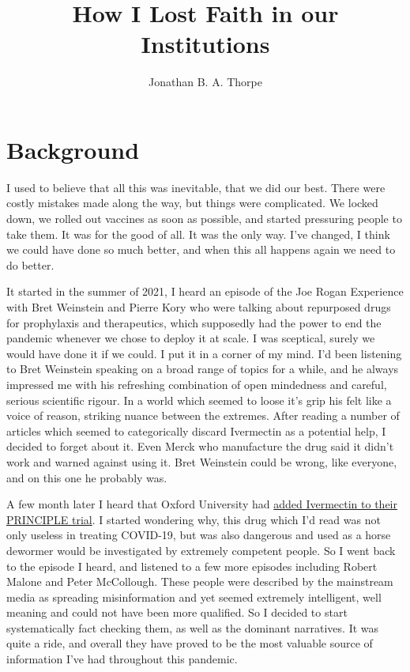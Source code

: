 \documentclass[11pt,a4paper]{article}
\title{How I Lost Faith in our Institutions}
\author{Jonathan B. A. Thorpe}
\begin{document}

\maketitle

\section*{Background}

I used to believe that all this was inevitable, that we did our best. There were costly mistakes made along the way, but things were complicated. We locked down, we rolled out vaccines as soon as possible, and started pressuring people to take them. It was for the good of all. It was the only way. I’ve changed, I think we could have done so much better, and when this all happens again we need to do better. 

It started in the summer of 2021, I heard an episode of the Joe Rogan Experience with Bret Weinstein and Pierre Kory who were talking about repurposed drugs for prophylaxis and therapeutics, which supposedly had the power to end the pandemic whenever we chose to deploy it at scale. I was sceptical, surely we would have done it if we could. I put it in a corner of my mind. I’d been listening to Bret Weinstein speaking on a broad range of topics for a while, and he always impressed me with his refreshing combination of open mindedness and careful, serious scientific rigour. In a world which seemed to loose it’s grip his felt like a voice of reason, striking nuance between the extremes. After reading a number of articles which seemed to categorically discard Ivermectin as a potential help, I decided to forget about it. Even Merck who manufacture the drug said it didn’t work and warned against using it. Bret Weinstein could be wrong, like everyone, and on this one he probably was.

A few month later I heard that Oxford University had \href{https://www.bbc.com/news/health-57570377}{added Ivermectin to their PRINCIPLE trial}. I started wondering why, this drug which I’d read was not only useless in treating COVID-19, but was also dangerous and used as a horse dewormer would be investigated by extremely competent people. So I went back to the episode I heard, and listened to a few more episodes including Robert Malone and Peter McCollough. These people were described by the mainstream media as spreading misinformation and yet seemed extremely intelligent, well meaning and could not have been more qualified. So I decided to start systematically fact checking them, as well as the dominant narratives. It was quite a ride, and overall they have proved to be the most valuable source of information I’ve had throughout this pandemic.
\end{document}
